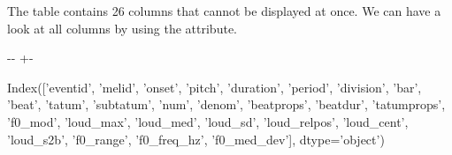 \documentclass[letterpaper,10pt,english]{sphinxmanual}
\newlength\nbsphinxcodecellspacing
\begin{document}
The  table contains 26 columns that cannot be displayed at once. We can have a look at all columns by using the  attribute.

{
\begin{sphinxVerbatim}[commandchars=\\\{\}]
\llap{\color{nbsphinxin}[10]:\,\hspace{\fboxrule}\hspace{\fboxsep}}
\end{sphinxVerbatim}
}

{

\kern-\sphinxverbatimsmallskipamount\kern-\baselineskip
\kern+\FrameHeightAdjust\kern-\fboxrule
\vspace{\nbsphinxcodecellspacing}

\begin{sphinxVerbatim}[commandchars=\\\{\}]
\llap{\color{nbsphinxout}[10]:\,\hspace{\fboxrule}\hspace{\fboxsep}}Index(['eventid', 'melid', 'onset', 'pitch', 'duration', 'period', 'division',
       'bar', 'beat', 'tatum', 'subtatum', 'num', 'denom', 'beatprops',
       'beatdur', 'tatumprops', 'f0\_mod', 'loud\_max', 'loud\_med', 'loud\_sd',
       'loud\_relpos', 'loud\_cent', 'loud\_s2b', 'f0\_range', 'f0\_freq\_hz',
       'f0\_med\_dev'],
      dtype='object')
\end{sphinxVerbatim}
}

{
\begin{sphinxVerbatim}[commandchars=\\\{\}]
\llap{\color{nbsphinxin}[11]:\,\hspace{\fboxrule}\hspace{\fboxsep}}  \PYG{p}{[}\PYG{p}{[} \PYG{p}{]}\PYG{p}{]}
\end{sphinxVerbatim}
}
\end{document}
